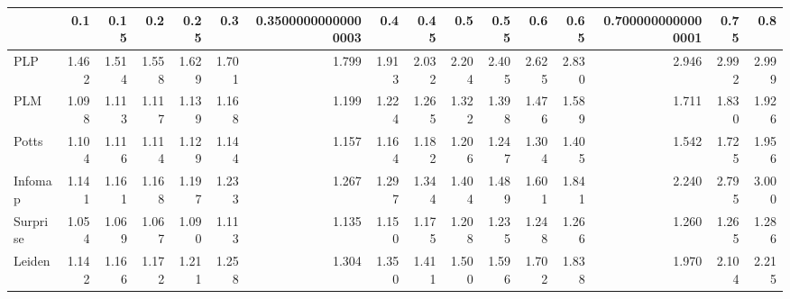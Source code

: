 \begin{tabular}{lrrrrrrrrrrrrrrr}
\toprule
{} &   0.1 &  0.15 &   0.2 &  0.25 &   0.3 & 0.35000000000000003 &   0.4 &  0.45 &   0.5 &  0.55 &   0.6 &  0.65 & 0.7000000000000001 &  0.75 &   0.8 \\
\midrule
PLP      & 1.462 & 1.514 & 1.558 & 1.629 & 1.701 &               1.799 & 1.913 & 2.032 & 2.204 & 2.405 & 2.625 & 2.830 &              2.946 & 2.992 & 2.999 \\
PLM      & 1.098 & 1.113 & 1.117 & 1.139 & 1.168 &               1.199 & 1.224 & 1.265 & 1.322 & 1.398 & 1.476 & 1.589 &              1.711 & 1.830 & 1.926 \\
Potts    & 1.104 & 1.116 & 1.114 & 1.129 & 1.144 &               1.157 & 1.164 & 1.182 & 1.206 & 1.247 & 1.304 & 1.405 &              1.542 & 1.725 & 1.956 \\
Infomap  & 1.141 & 1.161 & 1.168 & 1.197 & 1.233 &               1.267 & 1.297 & 1.344 & 1.404 & 1.489 & 1.601 & 1.841 &              2.240 & 2.795 & 3.000 \\
Surprise & 1.054 & 1.069 & 1.067 & 1.090 & 1.113 &               1.135 & 1.150 & 1.175 & 1.208 & 1.235 & 1.248 & 1.266 &              1.260 & 1.265 & 1.286 \\
Leiden   & 1.142 & 1.166 & 1.172 & 1.211 & 1.258 &               1.304 & 1.350 & 1.411 & 1.500 & 1.596 & 1.702 & 1.838 &              1.970 & 2.104 & 2.215 \\
\bottomrule
\end{tabular}
